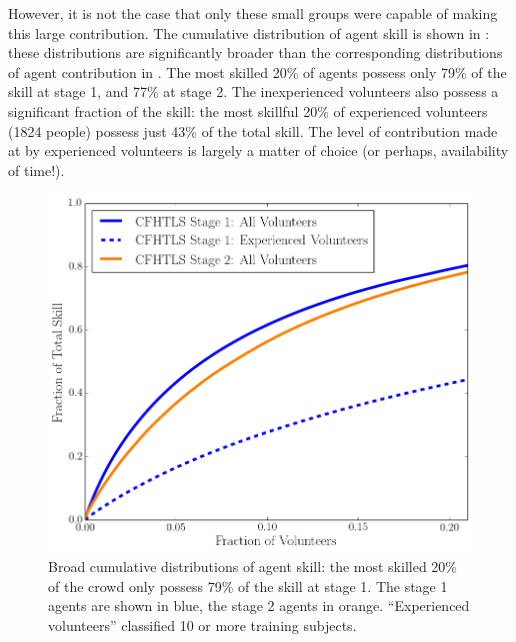 \documentclass[useAMS,usenatbib,a4paper]{mn2e}
\begin{document}
However, it is not the case that only these small groups were capable of
making this large contribution.
The cumulative distribution of agent skill is shown in
: these distributions are significantly broader
than the corresponding distributions of agent contribution in 
. The most skilled 20\% of agents possess only  79\%
of the skill at stage 1, and 77\% at stage 2. The inexperienced volunteers
also possess a significant fraction of the skill: the most skillful 20\% of
experienced volunteers (1824 people)  possess just 43\% of the total skill.
The level of contribution made at \sw by experienced volunteers is largely a
matter of choice (or perhaps, availability of time!).

\begin{figure}
\centering\includegraphics[width=0.9\linewidth]{sw-system-figs/crowd_skill_cumul.png}
\caption{Broad cumulative distributions of agent skill: 
the most skilled 20\% of the crowd only possess 79\% of the skill at stage 1.
The stage 1 agents
are shown in blue, the stage 2 agents in orange. ``Experienced volunteers''
classified 10 or more training subjects.}
\label{fig:crowd:cumulskillplot}
\end{figure}


\end{document}
